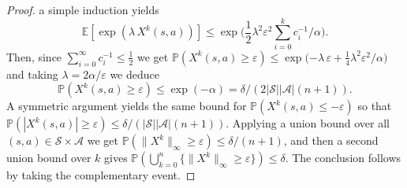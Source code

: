 \documentclass{article}
\newcommand{\cA}{\mathcal{A}}
\newcommand{\cS}{\mathcal{S}}
\newcommand{\expec}{\mathbb{E}}
\newcommand{\prob}{\mathbb{P}}
\theoremstyle{plain}
\theoremstyle{definition}
\theoremstyle{remark}
\begin{document}
\begin{proof}
a simple induction yields $$\expec[\exp(\lambda\,X^k(s,a))]\leq\exp\big(\mbox{$\frac{1}{2}\lambda^2\varepsilon^2\sum^k_{i=0} c^{-1}_i/\alpha$}\big).$$ Then, since $\sum^{\infty}_{i=0}c^{-1}_i\leq\frac{1}{2}$ we get
$\prob(X^k(s,a)\geq\varepsilon)\leq \exp\big(\mbox{$-\lambda\,\varepsilon+\frac{1}{4}\lambda^2\varepsilon^2/\alpha$}\big)$ and 
taking $\lambda=2\alpha/\varepsilon$ we deduce
$$\prob(X^k(s,a)\geq\varepsilon)\leq \exp(-\alpha)=\delta/(2|\cS||\cA|(n\!+\!1)).$$
A symmetric argument yields the same bound for $\prob(X^k(s,a)\leq-\varepsilon)$ so that 
$\prob(|X^k(s,a)|\geq\varepsilon)\leq \delta/(|\cS||\cA|(n\!+\!1))$. Applying a union bound over all $(s,a)\in\cS\times\cA$ we get $\prob(\|X^k\|_\infty\geq\varepsilon)\leq \delta/(n\!+\!1)$, and then a second union bound over $k$ gives $\prob(\bigcup_{k=0}^n\{\|X^k\|_\infty\geq\varepsilon\})\leq \delta$. The conclusion follows by taking the complementary event.
\end{proof}
\end{document}
